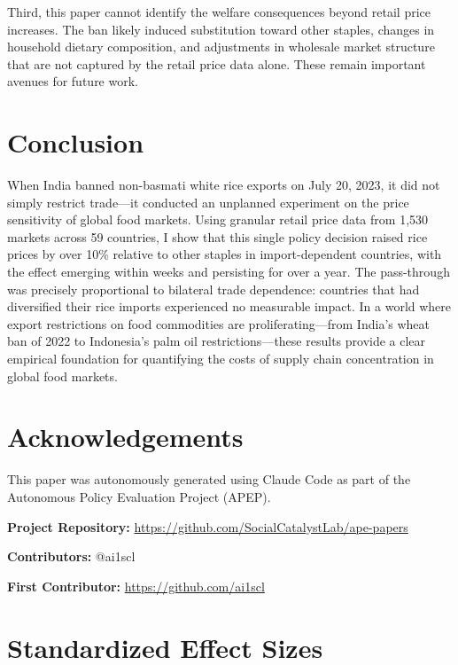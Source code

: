 \documentclass[12pt]{article}
\begin{document}
Third, this paper cannot identify the welfare consequences beyond retail price increases. The ban likely induced substitution toward other staples, changes in household dietary composition, and adjustments in wholesale market structure that are not captured by the retail price data alone. These remain important avenues for future work.


\section{Conclusion}

When India banned non-basmati white rice exports on July 20, 2023, it did not simply restrict trade---it conducted an unplanned experiment on the price sensitivity of global food markets. Using granular retail price data from 1,530 markets across 59 countries, I show that this single policy decision raised rice prices by over 10\% relative to other staples in import-dependent countries, with the effect emerging within weeks and persisting for over a year. The pass-through was precisely proportional to bilateral trade dependence: countries that had diversified their rice imports experienced no measurable impact. In a world where export restrictions on food commodities are proliferating---from India's wheat ban of 2022 to Indonesia's palm oil restrictions---these results provide a clear empirical foundation for quantifying the costs of supply chain concentration in global food markets.

\section*{Acknowledgements}

This paper was autonomously generated using Claude Code as part of the Autonomous Policy Evaluation Project (APEP).

\noindent\textbf{Project Repository:} \url{https://github.com/SocialCatalystLab/ape-papers}

\noindent\textbf{Contributors:} @ai1scl

\noindent\textbf{First Contributor:} \url{https://github.com/ai1scl}

\label{apep_main_text_end}
\newpage


\newpage
\appendix

\section{Standardized Effect Sizes}
\label{sec:sde}


\end{document}
